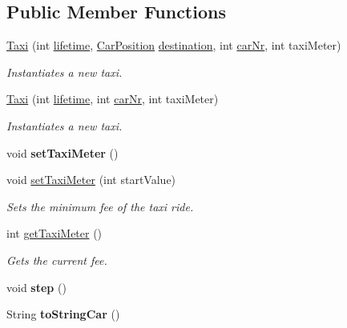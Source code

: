 \subsection*{Public Member Functions}
\begin{DoxyCompactItemize}
\item 
\hyperlink{class_taxi_a16402b42676323729ad6b4d283771eea}{Taxi} (int \hyperlink{class_car_a6c77e5ff6ce04822eca2d7b246d3b516}{lifetime}, \hyperlink{class_car_position}{Car\+Position} \hyperlink{class_car_a8ec85c8488be9a19f14077fb861b7753}{destination}, int \hyperlink{class_car_afde6b5c1b796970c1c57c3039058b731}{car\+Nr}, int taxi\+Meter)
\begin{DoxyCompactList}\small\item\em Instantiates a new taxi. \end{DoxyCompactList}\item 
\hyperlink{class_taxi_a654057a5ef1ac9f66ec76870ea370cf8}{Taxi} (int \hyperlink{class_car_a6c77e5ff6ce04822eca2d7b246d3b516}{lifetime}, int \hyperlink{class_car_afde6b5c1b796970c1c57c3039058b731}{car\+Nr}, int taxi\+Meter)
\begin{DoxyCompactList}\small\item\em Instantiates a new taxi. \end{DoxyCompactList}\item 
\hypertarget{class_taxi_aaffb4b1381ca9a4e2307b30f17dda81a}{void {\bfseries set\+Taxi\+Meter} ()}\label{class_taxi_aaffb4b1381ca9a4e2307b30f17dda81a}

\item 
void \hyperlink{class_taxi_aa6f84882574d16f77f422f4a57741ac7}{set\+Taxi\+Meter} (int start\+Value)
\begin{DoxyCompactList}\small\item\em Sets the minimum fee of the taxi ride. \end{DoxyCompactList}\item 
int \hyperlink{class_taxi_a0b3e8482ad0f165bb6ca3cbc00ef718d}{get\+Taxi\+Meter} ()
\begin{DoxyCompactList}\small\item\em Gets the current fee. \end{DoxyCompactList}\item 
\hypertarget{class_taxi_aced2dfec50f10af03e986f8aa769f7a6}{void {\bfseries step} ()}\label{class_taxi_aced2dfec50f10af03e986f8aa769f7a6}

\item 
\hypertarget{class_taxi_a2be5fe5734598a2811b323ae03da0d2b}{String {\bfseries to\+String\+Car} ()}\label{class_taxi_a2be5fe5734598a2811b323ae03da0d2b}

\end{DoxyCompactItemize}
